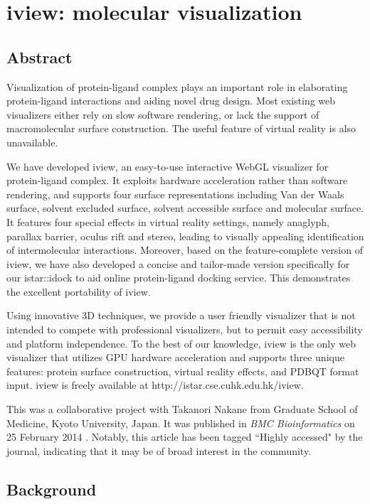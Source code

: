 \chapter{iview: molecular visualization}

\section{Abstract}

Visualization of protein-ligand complex plays an important role in elaborating protein-ligand interactions and aiding novel drug design. Most existing web visualizers either rely on slow software rendering, or lack the support of macromolecular surface construction. The useful feature of virtual reality is also unavailable.

We have developed iview, an easy-to-use interactive WebGL visualizer for protein-ligand complex. It exploits hardware acceleration rather than software rendering, and supports four surface representations including Van der Waals surface, solvent excluded surface, solvent accessible surface and molecular surface. It features four special effects in virtual reality settings, namely anaglyph, parallax barrier, oculus rift and stereo, leading to visually appealing identification of intermolecular interactions. Moreover, based on the feature-complete version of iview, we have also developed a concise and tailor-made version specifically for our istar::idock to aid online protein-ligand docking service. This demonstrates the excellent portability of iview.

Using innovative 3D techniques, we provide a user friendly visualizer that is not intended to compete with professional visualizers, but to permit easy accessibility and platform independence. To the best of our knowledge, iview is the only web visualizer that utilizes GPU hardware acceleration and supports three unique features: protein surface construction, virtual reality effects, and PDBQT format input. iview is freely available at http://istar.cse.cuhk.edu.hk/iview.

This was a collaborative project with Takanori Nakane from Graduate School of Medicine, Kyoto University, Japan. It was published in \textit{BMC Bioinformatics} on 25 February 2014 \citep{1366}. Notably, this article has been tagged ``Highly accessed" by the journal, indicating that it may be of broad interest in the community.

\section{Background}

